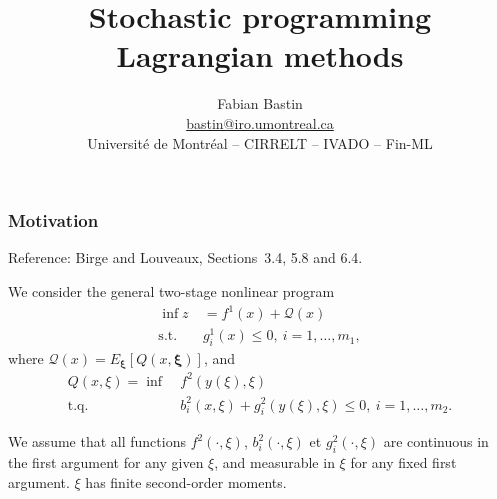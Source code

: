 \documentclass{beamer}
\title[Stochastic Lagrangian]{Stochastic programming\\Lagrangian methods}
\author[Fabian Bastin]{Fabian Bastin \\ \url{bastin@iro.umontreal.ca} \\ Université de Montréal -- CIRRELT -- IVADO -- Fin-ML}
\date{}
\def\bxi{\boldsymbol\xi}
\begin{document}
\frame{\titlepage}

\begin{frame}
\frametitle{Motivation}

{\red Reference}: Birge and Louveaux, Sections~3.4, 5.8 and 6.4.

\mbox{}

We consider the general {\blue two-stage nonlinear program}
\begin{align*}
\inf z\ &= f^1(x) + \mathcal{Q}(x) \\
\mbox{s.t. } & g_i^1(x) \leq 0,\ i = 1,\ldots,m_1,
\end{align*}
where $\mathcal{Q}(x) = E_{\bxi}[Q(x,\bxi)]$, and
\begin{align*}
Q(x,\xi) = \inf\ & f^2(y(\xi),\xi) \\
\mbox{t.q. } & b_i^2(x,\xi) + g_i^2(y(\xi), \xi) \leq 0,\ i = 1,\ldots,m_2.
\end{align*}

We assume that all functions $f^2(\cdot,\xi)$, $b_i^2(\cdot,\xi)$ et $g_i^2(\cdot,\xi)$ are continuous in the first argument for any given $\xi$, and measurable in $\xi$ for any fixed first argument. $\xi$ has finite second-order moments.

\end{frame}



\end{document}
